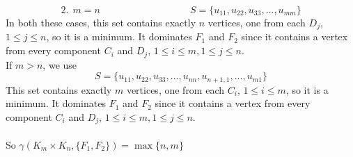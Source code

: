 \documentclass[letterpaper, 11pt]{article}
\newcommand{\1}{\mathds{1}}	%
\theoremstyle{definition}
\begin{document}
\[
2. \ \ m = n \quad \quad \quad \quad \quad \quad \ \quad \quad \quad S = \{u_{11}, u_{22}, u_{33}, ..., u_{mm}\}
\]
In both these cases, this set contains exactly $n$ vertices, one from each $D_j$, $1 \le j \le n$, so it is a minimum. It dominates $F_1$ and $F_2$ since it contains a vertex from every component $C_i$ and $D_j$, $1 \le i \le m, 1 \le j \le n$. ~\\
If $m > n$, we use 
\[
S = \{u_{11}, u_{22}, u_{33}, ..., u_{nn}, u_{n+1, 1}, ..., u_{m1}\}
\]
This set contains exactly $m$ vertices, one from each $C_i$, $1 \le i \le m$, so it is a minimum. It dominates $F_1$ and $F_2$ since it contains a vertex from every component $C_i$ and $D_j$, $1 \le i \le m, 1 \le j \le n$. ~\\
~\\So $\gamma (K_m \times K_n, \{F_1, F_2\}) = \max \{n,m\}$
\end{document}
